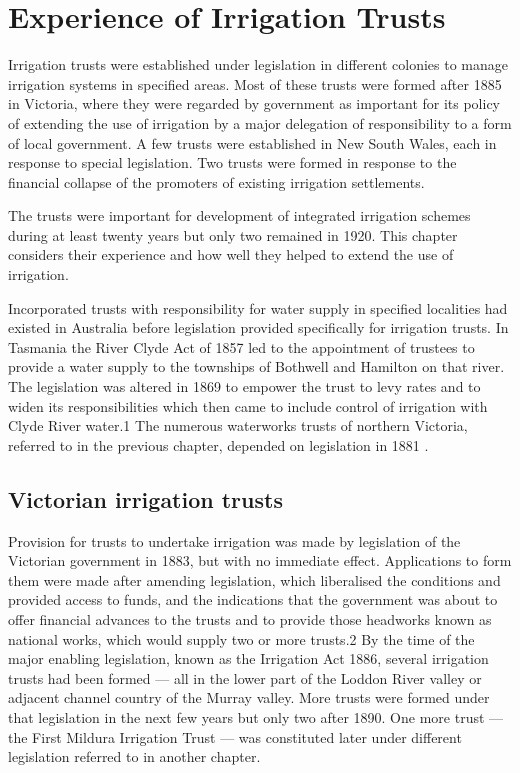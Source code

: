 
\chapter{Experience of Irrigation Trusts}

Irrigation trusts were established under legislation in different
colonies to manage irrigation systems in specified areas. Most of
these trusts were formed after 1885 in Victoria, where they were
regarded by government as important for its policy of extending the
use of irrigation by a major delegation of responsibility to a form of
local government. A few trusts were established in New South Wales,
each in response to special legislation. Two trusts were formed in
response to the financial collapse of the promoters of existing
irrigation settlements.

The trusts were important for development of integrated irrigation
schemes during at least twenty years but only two remained in
1920. This chapter considers their experience and how well they helped
to extend the use of irrigation.

Incorporated trusts with responsibility for water supply in specified
localities had existed in Australia before legislation provided
specifically for irrigation trusts. In Tasmania the River Clyde Act of
1857 led to the appointment of trustees to provide a water supply to
the townships of Bothwell and Hamilton on that river. The legislation
was altered in 1869 to empower the trust to levy rates and to widen
its responsibilities which then came to include control of irrigation
with Clyde River water.1 The numerous waterworks trusts of northern
Victoria, referred to in the previous chapter, depended on legislation
in 1881 .

\section{Victorian irrigation trusts}

Provision for trusts to undertake irrigation was made by legislation
of the Victorian government in 1883, but with no immediate
effect. Applications to form them were made after amending
legislation, which liberalised the conditions and provided access to
funds, and the indications that the government was about to offer
financial advances to the trusts and to provide those headworks known
as national works, which would supply two or more trusts.2 By the time
of the major enabling legislation, known as the Irrigation Act 1886,
several irrigation trusts had been formed --- all in the lower part of
the Loddon River valley or adjacent channel country of the Murray
valley. More trusts were formed under that legislation in the next few
years but only two after 1890. One more trust --- the First Mildura
Irrigation Trust --- was constituted later under different legislation
referred to in another chapter.

